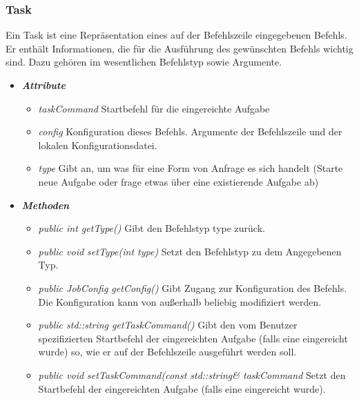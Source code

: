 \documentclass[a4paper,12pt]{article}
\begin{document}
\clearpage

\subsubsection{Task}

Ein Task ist eine Repräsentation eines auf der Befehlszeile eingegebenen Befehls. Er enthält Informationen, die für die Ausführung des gewünschten Befehls wichtig sind. Dazu gehören im wesentlichen Befehlstyp sowie Argumente.

\begin{itemize}[label={}]

	\item \textit{\textbf{Attribute}}
		\begin{itemize}[label={\textbullet}]
			\item \textit{taskCommand} Startbefehl für die eingereichte Aufgabe
			\item \textit{config} Konfiguration dieses Befehls. Argumente der Befehlszeile und der lokalen Konfigurationsdatei.
			\item \textit{type} Gibt an, um was für eine Form von Anfrage es sich handelt (Starte neue Aufgabe oder frage etwas über eine existierende Aufgabe ab)
		\end{itemize}

	\item \textit{\textbf{Methoden}}
		\begin{itemize}[label={\textbullet}]

			\item \textit{public int getType()} Gibt den Befehlstyp type zurück.

			\item \textit{public void setType(int type)} Setzt den Befehlstyp zu dem Angegebenen Typ. 

			\item \textit{public JobConfig getConfig()} Gibt Zugang zur Konfiguration des Befehls. Die Konfiguration kann von außerhalb beliebig modifiziert werden. 

			\item \textit{public std::string getTaskCommand()} Gibt den vom Benutzer spezifizierten Startbefehl der eingereichten Aufgabe (falls eine eingereicht wurde) so, wie er auf der Befehlszeile ausgeführt werden soll.

			\item \textit{public void setTaskCommand(const std::string\& taskCommand} Setzt den Startbefehl der eingereichten Aufgabe (falls eine eingereicht wurde).
		\end{itemize}

\end{itemize}
\end{document}
